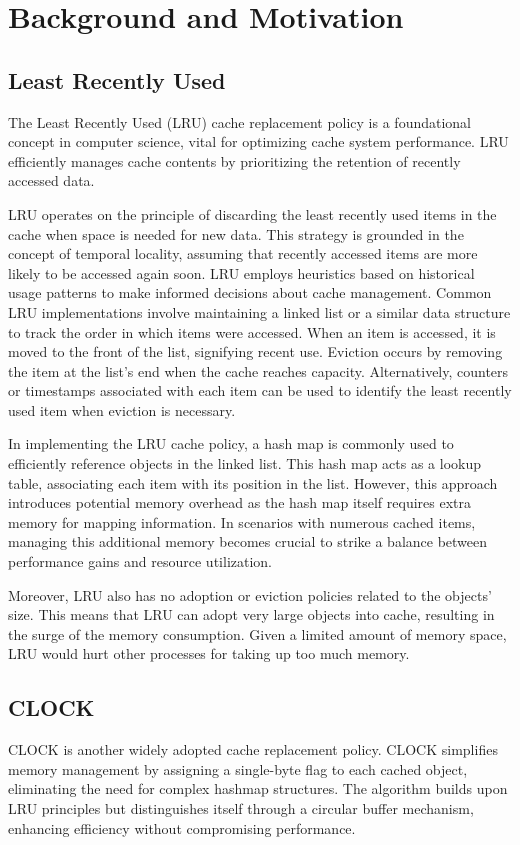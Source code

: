 \documentclass[conference]{IEEEtran}
\begin{document}
\section{Background and Motivation}

\subsection{Least Recently Used}
The Least Recently Used (LRU) \cite{b1} cache replacement policy is a foundational concept in computer science, vital for optimizing cache system performance. LRU efficiently manages cache contents by prioritizing the retention of recently accessed data.

LRU operates on the principle of discarding the least recently used items in the cache when space is needed for new data. This strategy is grounded in the concept of temporal locality, assuming that recently accessed items are more likely to be accessed again soon. LRU employs heuristics based on historical usage patterns to make informed decisions about cache management.
Common LRU implementations involve maintaining a linked list or a similar data structure to track the order in which items were accessed. When an item is accessed, it is moved to the front of the list, signifying recent use. Eviction occurs by removing the item at the list's end when the cache reaches capacity. Alternatively, counters or timestamps associated with each item can be used to identify the least recently used item when eviction is necessary.

In implementing the LRU cache policy, a hash map is commonly used to efficiently reference objects in the linked list. This hash map acts as a lookup table, associating each item with its position in the list. However, this approach introduces potential memory overhead as the hash map itself requires extra memory for mapping information. In scenarios with numerous cached items, managing this additional memory becomes crucial to strike a balance between performance gains and resource utilization.

Moreover, LRU also has no adoption or eviction policies related to the objects' size. This means that LRU can adopt very large objects into cache, resulting in the surge of the memory consumption. Given a limited amount of memory space, LRU would hurt other processes for taking up too much memory.

\subsection{CLOCK}
CLOCK \cite{b1} is another widely adopted cache replacement policy. CLOCK simplifies memory management by assigning a single-byte flag to each cached object, eliminating the need for complex hashmap structures. The algorithm builds upon LRU principles but distinguishes itself through a circular buffer mechanism, enhancing efficiency without compromising performance.
\end{document}
